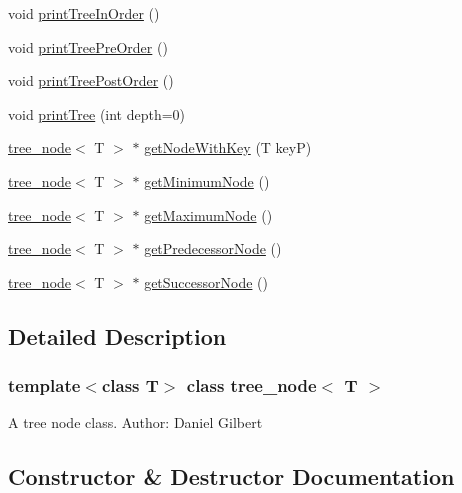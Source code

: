 \begin{DoxyCompactItemize}
\item 
void \hyperlink{classtree__node_ae87818a195621d4defc1cde67e7219ee}{print\+Tree\+In\+Order} ()
\item 
void \hyperlink{classtree__node_a2ca4e1521e6620bbe2418a9636a109a8}{print\+Tree\+Pre\+Order} ()
\item 
void \hyperlink{classtree__node_a4bfdd2b618c15252fcfbeab46ca05861}{print\+Tree\+Post\+Order} ()
\item 
void \hyperlink{classtree__node_a3a16e4e452fb27976139e59624d11846}{print\+Tree} (int depth=0)
\item 
\hyperlink{classtree__node}{tree\+\_\+node}$<$ T $>$ $\ast$ \hyperlink{classtree__node_a7216e66159b013b47e259555416ec72f}{get\+Node\+With\+Key} (T keyP)
\item 
\hyperlink{classtree__node}{tree\+\_\+node}$<$ T $>$ $\ast$ \hyperlink{classtree__node_afde196c44a09ac3fe97347d31540ea93}{get\+Minimum\+Node} ()
\item 
\hyperlink{classtree__node}{tree\+\_\+node}$<$ T $>$ $\ast$ \hyperlink{classtree__node_a70bdade8011a6a46b083ea680fcea52f}{get\+Maximum\+Node} ()
\item 
\hyperlink{classtree__node}{tree\+\_\+node}$<$ T $>$ $\ast$ \hyperlink{classtree__node_a5cce6c37b00a6d899e371c334559310e}{get\+Predecessor\+Node} ()
\item 
\hyperlink{classtree__node}{tree\+\_\+node}$<$ T $>$ $\ast$ \hyperlink{classtree__node_a666b33dc3b2f3e2d2e4815cc4ec8b131}{get\+Successor\+Node} ()
\end{DoxyCompactItemize}


\subsection{Detailed Description}
\subsubsection*{template$<$class T$>$\newline
class tree\+\_\+node$<$ T $>$}

A tree node class. Author\+: Daniel Gilbert 

\subsection{Constructor \& Destructor Documentation}
\mbox{\label{classtree__node_a776da4de6a1faef8b984f8b6dfe6eb6a}} 
